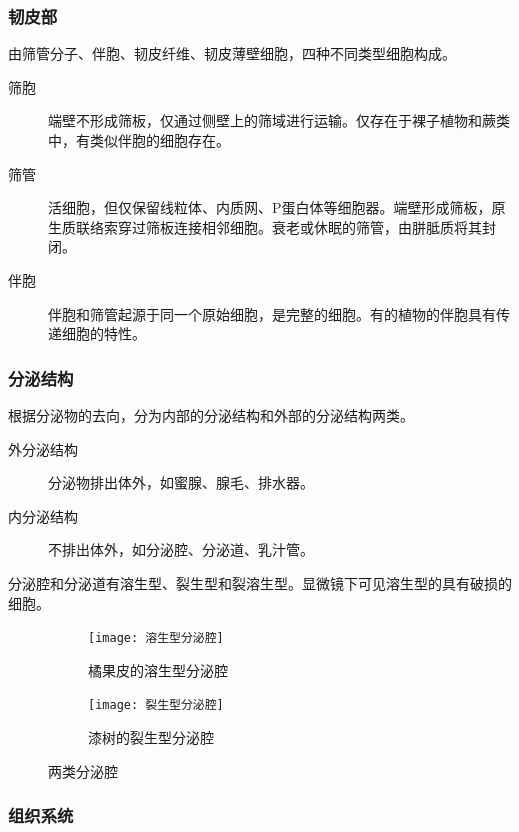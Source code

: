 	\subsubsection{韧皮部}
	
	由筛管分子、伴胞、韧皮纤维、韧皮薄壁细胞，四种不同类型细胞构成。
	
	\begin{description}
		\item[筛胞] 端壁不形成筛板，仅通过侧壁上的筛域进行运输。仅存在于裸子植物和蕨类中，有类似伴胞的细胞存在。
		\item[筛管] 活细胞，但仅保留线粒体、内质网、P蛋白体等细胞器。端壁形成筛板，原生质联络索穿过筛板连接相邻细胞。衰老或休眠的筛管，由胼胝质将其封闭。
		\item[伴胞] 伴胞和筛管起源于同一个原始细胞，是完整的细胞。有的植物的伴胞具有传递细胞的特性。
	\end{description}
	
	\subsubsection{分泌结构}
	
	根据分泌物的去向，分为内部的分泌结构和外部的分泌结构两类。
	
	\begin{description}
		\item[外分泌结构] 分泌物排出体外，如蜜腺、腺毛、排水器。
		\item[内分泌结构] 不排出体外，如分泌腔、分泌道、乳汁管。
	\end{description}
	
	分泌腔和分泌道有溶生型、裂生型和裂溶生型。显微镜下可见溶生型的具有破损的细胞。
	
	\begin{figure}[htbp]
		\centering
		\begin{subfigure}{0.45\textwidth}
			\texttt{[image: 溶生型分泌腔]}
			\caption{橘果皮的溶生型分泌腔}
		\end{subfigure}
		\hfill
		\begin{subfigure}{0.45\textwidth}
			\texttt{[image: 裂生型分泌腔]}
			\caption{漆树的裂生型分泌腔}
		\end{subfigure}
		\caption{两类分泌腔}
		\label{fig:两种不同的分泌腔}
	\end{figure}
	
	\subsubsection{组织系统}
	
